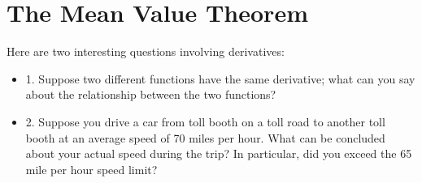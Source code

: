 \begin{exercises}
% 
%  
%  
%  
%  
%  
%  

\end{exercises}















\section{The Mean Value Theorem}

Here are two interesting questions involving derivatives:

\begin{itemize} %

\item{1.} Suppose two different functions have the same derivative;
  what can you say about the relationship between the two functions?

\item{2.} Suppose you drive a car from toll booth on a toll road to
  another toll booth at an
  average speed of 70 miles per hour. What can be concluded about your
  actual speed during the trip? In particular, did you exceed the 65
  mile per hour speed limit?

\end{itemize}

